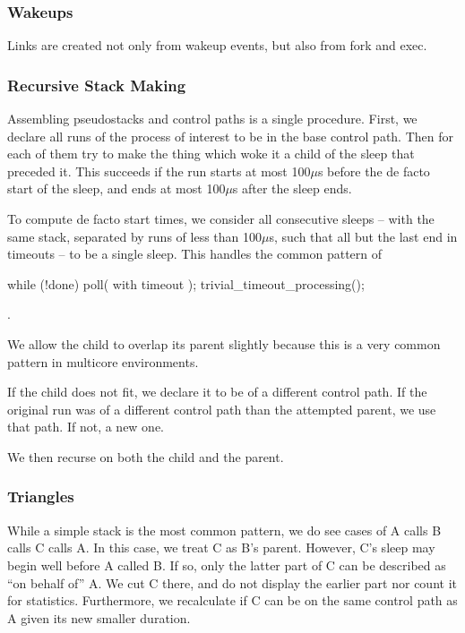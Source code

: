 \documentclass[10pt]{article}
\begin{document}
\subsubsection{Wakeups}

Links are created not only from wakeup events, but also from fork and exec.

\subsubsection{Recursive Stack Making}

Assembling pseudostacks and control paths is a single procedure.  First, we declare all runs of the process of interest to be in the base control path.  Then for each of them try to make the thing which woke it a child of the sleep that preceded it.  This succeeds if the run starts at most 100$\mu$s before the de facto start of the sleep, and ends at most 100$\mu$s after the sleep ends.  

To compute de facto start times, we consider all consecutive sleeps -- with the same stack, separated by runs of less than 100$\mu$s, such that all but the last end in timeouts -- to be a single sleep.  This handles the common pattern of \begin{tt}while (!done) { poll( with timeout ); trivial\_timeout\_processing(); }\end{tt}.

We allow the child to overlap its parent slightly because this is a very common pattern in multicore environments.

If the child does not fit, we declare it to be of a different control path.  If the original run was of a different control path than the attempted parent, we use that path.  If not, a new one.

We then recurse on both the child and the parent. 

\subsubsection{Triangles}

While a simple stack is the most common pattern, we do see cases of A calls B calls C calls A.  In this case, we treat C as B's parent.  However, C's sleep may begin well before A called B.  If so, only the latter part of C can be described as ``on behalf of'' A.  We cut C there, and do not display the earlier part nor count it for statistics.  Furthermore, we recalculate if C can be on the same control path as A given its new smaller duration.
\end{document}
